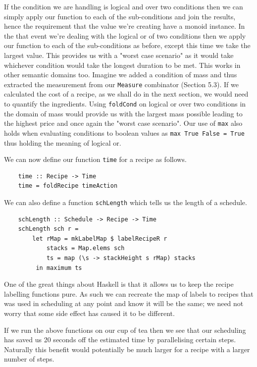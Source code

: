 \documentclass[11pt]{article}
\begin{document}
If the condition we are handling is logical and over two conditions then we can simply apply our function
to each of the sub-conditions and join the results, hence the requirement that the value we're
creating have a monoid instance. In the that event we're dealing with the logical or of two conditions then
we apply our function to each of the sub-conditions as before, except this time we take the largest value.
This provides us with a "worst case scenario" as it would take whichever condition would take the longest
duration to be met. This works in other semantic domains too. Imagine we added a condition of mass and thus
extracted the measurement from our \texttt{Measure} combinator (Section 5.3). If we calculated the cost of a recipe, as we shall
do in the next section, we would need to quantify the ingredients. Using \texttt{foldCond} on logical or over two
conditions in the domain of mass would provide us with the largest mass possible leading to the highest price and
once again the "worst case scenario". Our use of \texttt{max} also holds when evaluating conditions to boolean values
as \texttt{max True False = True} thus holding the meaning of logical or.

\medbreak

We can now define our function \texttt{time} for a recipe as follows.

\begin{lstlisting}
    time :: Recipe -> Time
    time = foldRecipe timeAction
\end{lstlisting}

We can also define a function \texttt{schLength} which tells us the length of a schedule.

\begin{lstlisting}
    schLength :: Schedule -> Recipe -> Time
    schLength sch r =
        let rMap = mkLabelMap $ labelRecipeR r
            stacks = Map.elems sch
            ts = map (\s -> stackHeight s rMap) stacks
         in maximum ts
\end{lstlisting}

One of the great things about Haskell is that it allows us to keep the recipe labelling
functions pure. As such we can recreate the map of labels to recipes that was used in
scheduling at any point and know it will be the same; we need not worry that some side
effect has caused it to be different.

\medbreak

If we run the above functions on our cup of tea then we see that our scheduling has
saved us 20 seconds off the estimated time by parallelising certain steps. Naturally
this benefit would potentially be much larger for a recipe with a larger number of steps.
\end{document}
